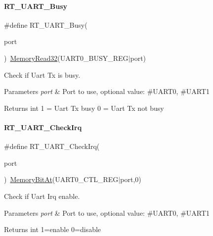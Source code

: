 \paragraph{\texorpdfstring{R\+T\+\_\+\+U\+A\+R\+T\+\_\+\+Busy}{RT\_UART\_Busy}}
{\footnotesize\ttfamily \#define R\+T\+\_\+\+U\+A\+R\+T\+\_\+\+Busy(\begin{DoxyParamCaption}\item[{}]{port }\end{DoxyParamCaption})~\mbox{\hyperlink{a00020_a706b02571285f92589fbb0b964d7d0bb}{Memory\+Read32}}(U\+A\+R\+T0\+\_\+\+B\+U\+S\+Y\+\_\+\+R\+EG$\vert$port)}



Check if Uart Tx is busy. 


\begin{DoxyParams}{Parameters}
{\em port} & Port to use, optional value\+: \#\+U\+A\+R\+T0, \#\+U\+A\+R\+T1 \\
\hline
\end{DoxyParams}
\begin{DoxyReturn}{Returns}
int 1 = Uart Tx busy 0 = Uart Tx not busy 
\end{DoxyReturn}
\mbox{\label{a00056_a3e29e879f76b82a13419f4d59a1c3053}} 
\paragraph{\texorpdfstring{R\+T\+\_\+\+U\+A\+R\+T\+\_\+\+Check\+Irq}{RT\_UART\_CheckIrq}}
{\footnotesize\ttfamily \#define R\+T\+\_\+\+U\+A\+R\+T\+\_\+\+Check\+Irq(\begin{DoxyParamCaption}\item[{}]{port }\end{DoxyParamCaption})~\mbox{\hyperlink{a00020_aaa87daf3a7b5e127c21919e520e58282}{Memory\+Bit\+At}}(U\+A\+R\+T0\+\_\+\+C\+T\+L\+\_\+\+R\+EG$\vert$port,0)}



Check if Uart Irq enable. 


\begin{DoxyParams}{Parameters}
{\em port} & Port to use, optional value\+: \#\+U\+A\+R\+T0, \#\+U\+A\+R\+T1 \\
\hline
\end{DoxyParams}
\begin{DoxyReturn}{Returns}
int 1=enable 0=disable 
\end{DoxyReturn}
\mbox{\label{a00056_a84e87fc64f3149f1d5171ddca5719220}} 
